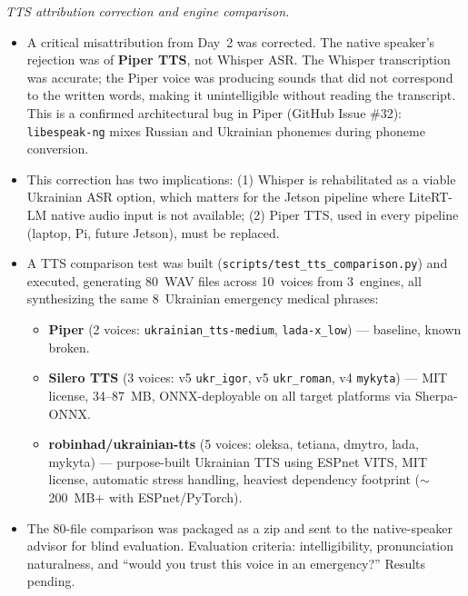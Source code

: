 \documentclass{article}
\theoremstyle{plain}
\theoremstyle{definition}
\theoremstyle{remark}
\begin{document}
\textit{TTS attribution correction and engine comparison.}
\begin{itemize}
\item A critical misattribution from Day~2 was corrected. The native speaker's rejection was of \textbf{Piper TTS}, not Whisper ASR. The Whisper transcription was accurate; the Piper voice was producing sounds that did not correspond to the written words, making it unintelligible without reading the transcript. This is a confirmed architectural bug in Piper (GitHub Issue \#32): \texttt{libespeak-ng} mixes Russian and Ukrainian phonemes during phoneme conversion.
\item This correction has two implications: (1) Whisper is rehabilitated as a viable Ukrainian ASR option, which matters for the Jetson pipeline where LiteRT-LM native audio input is not available; (2) Piper TTS, used in every pipeline (laptop, Pi, future Jetson), must be replaced.
\item A TTS comparison test was built (\texttt{scripts/test\_tts\_comparison.py}) and executed, generating 80~WAV files across 10~voices from 3~engines, all synthesizing the same 8~Ukrainian emergency medical phrases:
  \begin{itemize}
  \item \textbf{Piper} (2 voices: \texttt{ukrainian\_tts-medium}, \texttt{lada-x\_low}) --- baseline, known broken.
  \item \textbf{Silero TTS} (3 voices: v5 \texttt{ukr\_igor}, v5 \texttt{ukr\_roman}, v4 \texttt{mykyta}) --- MIT license, 34--87~MB, ONNX-deployable on all target platforms via Sherpa-ONNX.
  \item \textbf{robinhad/ukrainian-tts} (5 voices: oleksa, tetiana, dmytro, lada, mykyta) --- purpose-built Ukrainian TTS using ESPnet VITS, MIT license, automatic stress handling, heaviest dependency footprint ($\sim$200~MB+ with ESPnet/PyTorch).
  \end{itemize}
\item The 80-file comparison was packaged as a zip and sent to the native-speaker advisor for blind evaluation. Evaluation criteria: intelligibility, pronunciation naturalness, and ``would you trust this voice in an emergency?'' Results pending.
\end{itemize}
\end{document}
